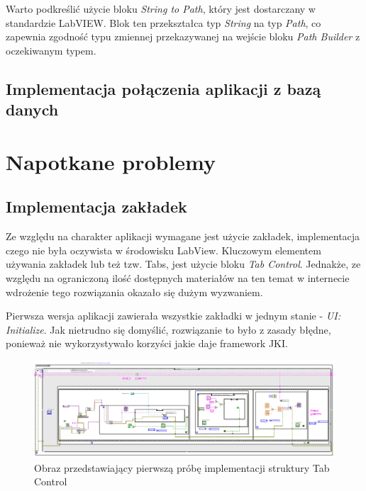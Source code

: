 \documentclass{report}
\begin{document}
Warto podkreślić użycie bloku \textit{String to Path}, który jest dostarczany w standardzie LabVIEW. Blok ten przekształca typ \textit{String} na typ \textit{Path}, co zapewnia zgodność typu zmiennej przekazywanej na wejście bloku \textit{Path Builder} z oczekiwanym typem.



\subsection{\Large Implementacja połączenia aplikacji z bazą danych}

%
%

\section{\LARGE Napotkane problemy}
\subsection{\Large Implementacja zakładek}

Ze względu na charakter aplikacji wymagane jest użycie zakładek, implementacja czego nie była oczywista w środowisku LabView. Kluczowym elementem używania zakładek lub też tzw. Tabs, jest użycie bloku \textit{Tab Control}. Jednakże, ze względu na ograniczoną ilość dostępnych materiałów na ten temat w internecie wdrożenie tego rozwiązania okazało się dużym wyzwaniem. 

Pierwsza wersja aplikacji zawierała wszystkie zakładki w jednym stanie - \textit{UI: Initialize}. Jak nietrudno się domyślić, rozwiązanie to było z zasady błędne, ponieważ nie wykorzystywało korzyści jakie daje framework JKI. 

\begin{figure}[H]
    \centering
    \includegraphics[width=1.0\textwidth]{src/first-att.png}
    \caption{Obraz przedstawiający pierwszą próbę implementacji struktury Tab Control}
    \label{fig:first-att}
\end{figure}
\end{document}
